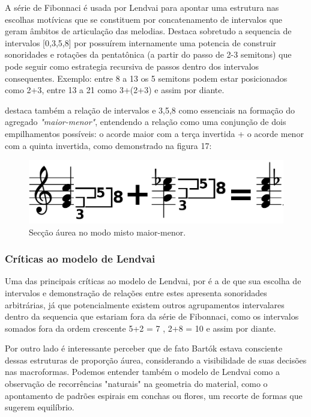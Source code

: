 \documentclass[
	12pt,				%
	openright,			%
	twoside,			%
	a4paper,			%
	english,			%
	french,				%
	spanish,			%
	brazil				%
	]{abntex2}
\begin{document}
A série de Fibonnaci é usada por Lendvai para apontar uma estrutura nas escolhas motívicas que se constituem por concatenamento de intervalos que geram âmbitos de articulação das melodias. Destaca sobretudo a sequencia de intervalos [0,3,5,8] por possuírem internamente uma potencia de construir sonoridades e rotações da pentatônica (a partir do passo de 2-3 semitons) que pode seguir como estrategia recursiva de passos dentro dos intervalos consequentes. Exemplo: entre 8 a 13 os 5 semitons podem estar posicionados como 2+3, entre 13 a 21 como 3+(2+3) e assim por diante.

 destaca também a relação de intervalos e 3,5,8 como essenciais na formação do agregado \textit{"maior-menor"}, entendendo a relação como uma conjunção de dois empilhamentos possíveis: o acorde maior com a terça invertida + o acorde menor com a quinta invertida, como demonstrado na figura 17:

\begin{figure}[!h]
	\caption{\label{fig_grafico}Secção áurea no modo misto maior-menor.  }
	\begin{center}
	    \includegraphics[scale=0.3]{axis/GS_maior_menor.png}
	\end{center}
\end{figure} 



\subsubsection{Críticas ao modelo de Lendvai}

Uma das principais críticas ao modelo de Lendvai, por  é a de que sua escolha de intervalos e demonstração de relações entre estes apresenta sonoridades arbitrárias, já que potencialmente existem outros agrupamentos intervalares dentro da sequencia que estariam fora da série de Fibonnaci, como os intervalos somados fora da ordem crescente 5+2 = 7 , 2+8 = 10 e assim por diante.

Por outro lado é interessante perceber que de fato Bartók estava consciente dessas estruturas de proporção áurea, considerando a visibilidade de suas decisões nas macroformas. Podemos entender também o modelo de Lendvai como a observação de recorrências "naturais" na geometria do material, como o apontamento de padrões espirais em conchas ou flores, um recorte de formas que sugerem equilíbrio.
\end{document}
